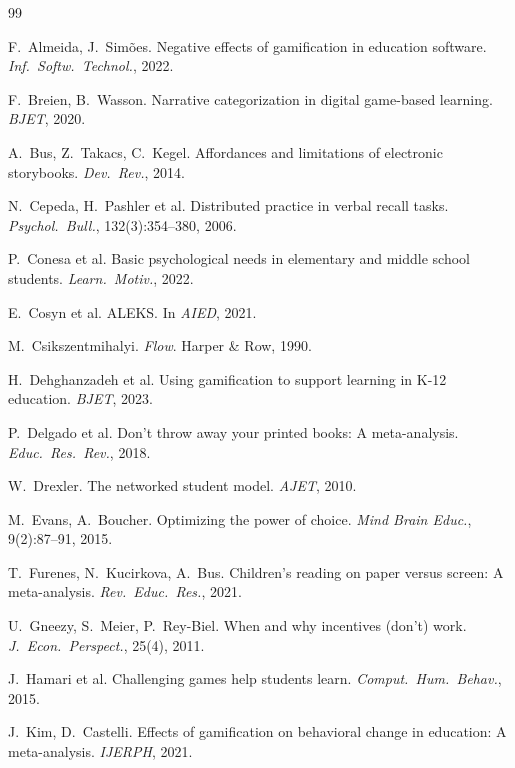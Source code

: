 \documentclass[11pt,a4paper]{article}
\begin{document}

\begin{thebibliography}{99}
\small

 F.~Almeida, J.~Sim\~oes. Negative effects of gamification in education software. \emph{Inf.\ Softw.\ Technol.}, 2022.

 F.~Breien, B.~Wasson. Narrative categorization in digital game-based learning. \emph{BJET}, 2020.

 A.~Bus, Z.~Takacs, C.~Kegel. Affordances and limitations of electronic storybooks. \emph{Dev.\ Rev.}, 2014.

 N.~Cepeda, H.~Pashler et al. Distributed practice in verbal recall tasks. \emph{Psychol.\ Bull.}, 132(3):354--380, 2006.

 P.~Conesa et al. Basic psychological needs in elementary and middle school students. \emph{Learn.\ Motiv.}, 2022.

 E.~Cosyn et al. ALEKS. In \emph{AIED}, 2021.

 M.~Csikszentmihalyi. \emph{Flow}. Harper \& Row, 1990.

 H.~Dehghanzadeh et al. Using gamification to support learning in K-12 education. \emph{BJET}, 2023.

 P.~Delgado et al. Don't throw away your printed books: A meta-analysis. \emph{Educ.\ Res.\ Rev.}, 2018.

 W.~Drexler. The networked student model. \emph{AJET}, 2010.

 M.~Evans, A.~Boucher. Optimizing the power of choice. \emph{Mind Brain Educ.}, 9(2):87--91, 2015.

 T.~Furenes, N.~Kucirkova, A.~Bus. Children's reading on paper versus screen: A meta-analysis. \emph{Rev.\ Educ.\ Res.}, 2021.

 U.~Gneezy, S.~Meier, P.~Rey-Biel. When and why incentives (don't) work. \emph{J.\ Econ.\ Perspect.}, 25(4), 2011.

 J.~Hamari et al. Challenging games help students learn. \emph{Comput.\ Hum.\ Behav.}, 2015.

 J.~Kim, D.~Castelli. Effects of gamification on behavioral change in education: A meta-analysis. \emph{IJERPH}, 2021.


\end{thebibliography}
\end{document}
